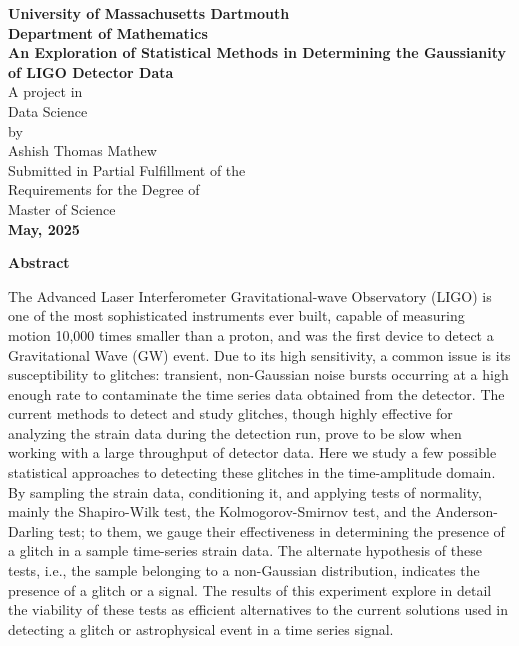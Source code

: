 \documentclass[12pt]{article}
\begin{document}
\begin{titlepage}
  \vspace*{1cm}
  \centering
  {\LARGE \textbf{University of Massachusetts Dartmouth}}\\[1.5cm]
  {\Large \textbf{Department of Mathematics}}\\[2cm]
  {\huge \textbf{An Exploration of Statistical Methods in Determining the Gaussianity of LIGO Detector Data}}\\[3cm]
  {\Large A project in}\\[0.2cm]
  {\Large Data Science}\\[0.2cm]
  {\Large by}\\[0.2cm]
  {\Large Ashish Thomas Mathew}\\[2.5cm]
  {\Large Submitted in Partial Fulfillment of the}\\[0.5cm]
  {\Large Requirements for the Degree of}\\[0.5cm]
  {\Large Master of Science}\\[2cm]
  {\large \textbf{May, 2025}}
  \vfill
\end{titlepage}

\clearpage  %
\normalfont %
\raggedright %

\begin{center}
    \Large \textbf{Abstract}  %
\end{center}

\justifying

\noindent The Advanced Laser Interferometer Gravitational-wave Observatory (LIGO) is one of the most sophisticated instruments ever built, capable of measuring motion 10,000 times smaller than a proton, and was the first device to detect a Gravitational Wave (GW) event. Due to its high sensitivity, a common issue is its susceptibility to glitches: transient, non-Gaussian noise bursts occurring at a high enough rate to contaminate the time series data obtained from the detector. The current methods to detect and study glitches, though highly effective for analyzing the strain data during the detection run, prove to be slow when working with a large throughput of detector data. Here we study a few possible statistical approaches to detecting these glitches in the time-amplitude domain. By sampling the strain data, conditioning it, and applying tests of normality, mainly the Shapiro-Wilk test, the Kolmogorov-Smirnov test, and the Anderson-Darling test; to them, we gauge their effectiveness in determining the presence of a glitch in a sample time-series strain data. The alternate hypothesis of these tests, i.e., the sample belonging to a non-Gaussian distribution, indicates the presence of a glitch or a signal. The results of this experiment explore in detail the viability of these tests as efficient alternatives to the current solutions used in detecting a glitch or astrophysical event in a time series signal.
\end{document}
